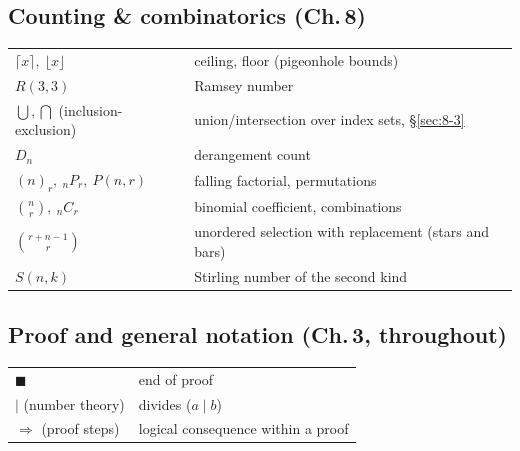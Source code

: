 \subsection*{Counting \& combinatorics (Ch.\,8)}
\begin{longtable}{ll}
$\lceil x\rceil,\ \lfloor x\rfloor$ & ceiling, floor (pigeonhole bounds) \\
$R(3,3)$ & Ramsey number \\
$\bigcup,\bigcap$ (inclusion-exclusion) & union/intersection over index sets, \S\ref{sec:8-3} \\
$D_n$ & derangement count \\
$(n)_r,\ {}_nP_r,\ P(n,r)$ & falling factorial, permutations \\
$\binom{n}{r},\ {}_nC_r$ & binomial coefficient, combinations \\
$\binom{r+n-1}{r}$ & unordered selection with replacement (stars and bars) \\
$S(n,k)$ & Stirling number of the second kind \\
\end{longtable}

\subsection*{Proof and general notation (Ch.\,3, throughout)}
\begin{longtable}{ll}
$\blacksquare$ & end of proof \\
$\mid$ (number theory) & divides ($a\mid b$) \\
$\Rightarrow$ (proof steps) & logical consequence within a proof \\
\end{longtable}

